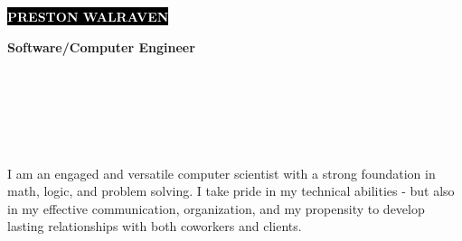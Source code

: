 \documentclass[9pt]{developercv} %
\begin{document}

\begin{minipage}[t]{0.4\textwidth}
	\vspace{-\baselineskip} %
	
	\colorbox{black}{{\Huge\textcolor{white}{\textbf{\MakeUppercase{Preston Walraven}}}}} %
	
	\vspace{6pt}

	{\LARGE \textbf{Software/Computer Engineer}} %
\end{minipage}
\begin{minipage}[t]{0.26\textwidth}
	\vspace{-\baselineskip} %

	\\
	\\	
\end{minipage}
\begin{minipage}[t]{0.34\textwidth}
	\vspace{-\baselineskip} %

	\\
	\\
\end{minipage}

\vspace{0.5cm}


I am an engaged and versatile computer scientist with a strong foundation in math, logic, 
and problem solving. I take pride in my technical abilities - but also in my effective 
communication, organization, and my propensity to develop lasting relationships with both coworkers
and clients.
\end{document}
